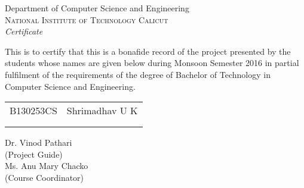 \newpage
\thispagestyle{empty}

\begin{center}

\huge{Department of Computer Science and Engineering}\\[0.5cm]
\normalsize
\textsc{National Institute of Technology Calicut}\\[2.0cm]

\emph{\LARGE Certificate}\\[2.5cm]
\end{center}
\normalsize This is to certify that this is a bonafide record of the project presented by the students whose names are given below during Monsoon Semester 2016 in partial fulfilment of the requirements of the degree of Bachelor of Technology in Computer Science and Engineering.\\[1.0cm]

\begin{table}[h]
\centering
\begin{tabular}{lr}
B130253CS & Shrimadhav U K \\ \\ \hline
\\
\end{tabular}
\end{table}

\vfill


\begin{flushright}
Dr. Vinod Pathari\\
(Project Guide)\\[1.5cm]



Ms. Anu Mary Chacko\\
(Course Coordinator)\\
\end{flushright}

\begin{flushleft}
\end{flushleft}
